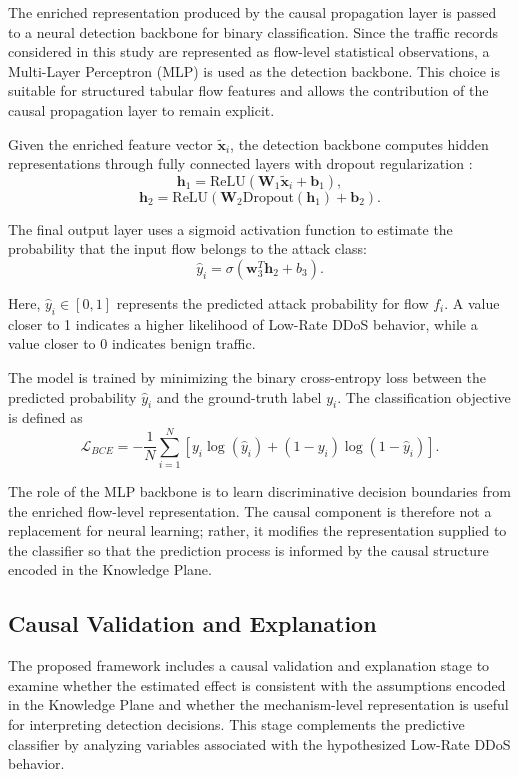 \documentclass[journal]{IEEEtran}
\begin{document}
The enriched representation produced by the causal propagation layer is passed to a neural detection backbone for binary classification. Since the traffic records considered in this study are represented as flow-level statistical observations, a Multi-Layer Perceptron (MLP) is used as the detection backbone. This choice is suitable for structured tabular flow features and allows the contribution of the causal propagation layer to remain explicit.

Given the enriched feature vector $\tilde{\mathbf{x}}_i$, the detection backbone computes hidden representations through fully connected layers with dropout regularization \cite{srivastava2014dropout}:
\[
  \mathbf{h}_1 = \mathrm{ReLU}(\mathbf{W}_1\tilde{\mathbf{x}}_i + \mathbf{b}_1),
\]
\[
  \mathbf{h}_2 = \mathrm{ReLU}(\mathbf{W}_2\mathrm{Dropout}(\mathbf{h}_1) + \mathbf{b}_2).
\]

The final output layer uses a sigmoid activation function to estimate the probability that the input flow belongs to the attack class:
\[
  \hat{y}_i = \sigma(\mathbf{w}_3^{T}\mathbf{h}_2 + b_3).
\]

Here, $\hat{y}_i \in [0,1]$ represents the predicted attack probability for flow $f_i$. A value closer to 1 indicates a higher likelihood of Low-Rate DDoS behavior, while a value closer to 0 indicates benign traffic.

The model is trained by minimizing the binary cross-entropy loss between the predicted probability $\hat{y}_i$ and the ground-truth label $y_i$. The classification objective is defined as
\[
  \mathcal{L}_{BCE}
  =
  -\frac{1}{N}\sum_{i=1}^{N}
  \left[
    y_i \log(\hat{y}_i) + (1-y_i)\log(1-\hat{y}_i)
  \right].
\]

The role of the MLP backbone is to learn discriminative decision boundaries from the enriched flow-level representation. The causal component is therefore not a replacement for neural learning; rather, it modifies the representation supplied to the classifier so that the prediction process is informed by the causal structure encoded in the Knowledge Plane.

\subsection{Causal Validation and Explanation}
\label{subsec:causal_validation_explanation}

The proposed framework includes a causal validation and explanation stage to examine whether the estimated effect is consistent with the assumptions encoded in the Knowledge Plane and whether the mechanism-level representation is useful for interpreting detection decisions. This stage complements the predictive classifier by analyzing variables associated with the hypothesized Low-Rate DDoS behavior.
\end{document}
